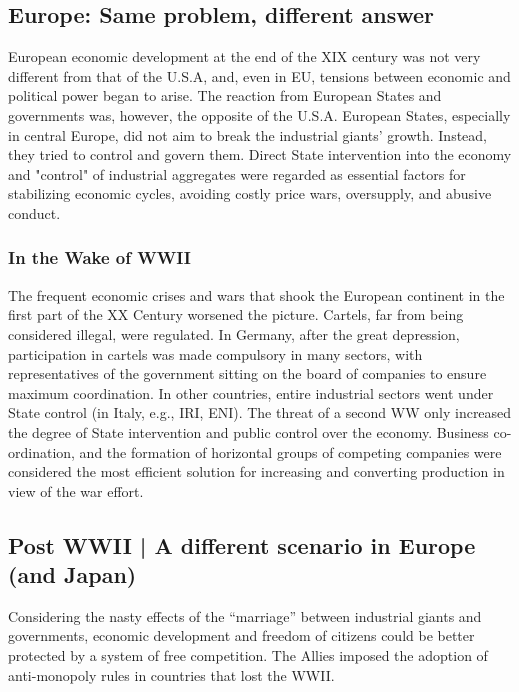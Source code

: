     \subsection{Europe: Same problem, different answer}

        European economic development at the end of the XIX century was not very different from that of the U.S.A, and, even in EU, tensions between economic and political power began to arise.
        The reaction from European States and governments was, however, the opposite of the U.S.A. European States, especially in central Europe, did not aim to break the industrial giants’ growth. Instead, they tried to control and govern them.
        Direct State intervention into the economy and "control" of industrial aggregates were regarded as essential factors for stabilizing economic cycles, avoiding costly price wars, oversupply, and abusive conduct. 

        \subsubsection{In the Wake of WWII}

            The frequent economic crises and wars that shook the European continent in the first part of the XX Century worsened the picture. Cartels, far from being considered illegal, were regulated. 
            In Germany, after the great depression, participation in cartels was made compulsory in many sectors, with representatives of the government sitting on the board of companies to ensure maximum coordination.  
            In other countries, entire industrial sectors went under State control (in Italy, e.g., IRI, ENI).
            The threat of a second WW only increased the degree of State intervention and public control over the economy. Business co-ordination, and the formation of horizontal groups of competing companies were considered the most efficient solution for increasing and converting production in view of the war effort. 

    \subsection{Post WWII | A different scenario in Europe (and Japan)}

        Considering the nasty effects of the “marriage” between industrial giants and governments, economic development and freedom of citizens could be better protected by a system of free competition.
        The Allies imposed the adoption of anti-monopoly rules in countries that lost the WWII. 

